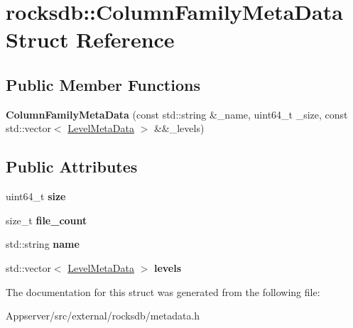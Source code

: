 \hypertarget{structrocksdb_1_1ColumnFamilyMetaData}{}\section{rocksdb\+:\+:Column\+Family\+Meta\+Data Struct Reference}
\label{structrocksdb_1_1ColumnFamilyMetaData}
\subsection*{Public Member Functions}
\begin{DoxyCompactItemize}
\item 
{\bfseries Column\+Family\+Meta\+Data} (const std\+::string \&\+\_\+name, uint64\+\_\+t \+\_\+size, const std\+::vector$<$ \hyperlink{structrocksdb_1_1LevelMetaData}{Level\+Meta\+Data} $>$ \&\&\+\_\+levels)\hypertarget{structrocksdb_1_1ColumnFamilyMetaData_a5dc118259236aa00f2c6b5818c6feaca}{}\label{structrocksdb_1_1ColumnFamilyMetaData_a5dc118259236aa00f2c6b5818c6feaca}

\end{DoxyCompactItemize}
\subsection*{Public Attributes}
\begin{DoxyCompactItemize}
\item 
uint64\+\_\+t {\bfseries size}\hypertarget{structrocksdb_1_1ColumnFamilyMetaData_a06bba2173e3c44b00fa2c6791c5d18cf}{}\label{structrocksdb_1_1ColumnFamilyMetaData_a06bba2173e3c44b00fa2c6791c5d18cf}

\item 
size\+\_\+t {\bfseries file\+\_\+count}\hypertarget{structrocksdb_1_1ColumnFamilyMetaData_ab664d07cbc915c6f422c454de03c7901}{}\label{structrocksdb_1_1ColumnFamilyMetaData_ab664d07cbc915c6f422c454de03c7901}

\item 
std\+::string {\bfseries name}\hypertarget{structrocksdb_1_1ColumnFamilyMetaData_a54f36744201ce9e2faf5f50bdf3866ec}{}\label{structrocksdb_1_1ColumnFamilyMetaData_a54f36744201ce9e2faf5f50bdf3866ec}

\item 
std\+::vector$<$ \hyperlink{structrocksdb_1_1LevelMetaData}{Level\+Meta\+Data} $>$ {\bfseries levels}\hypertarget{structrocksdb_1_1ColumnFamilyMetaData_aed3050fed4270bcff4ccc76323062fdd}{}\label{structrocksdb_1_1ColumnFamilyMetaData_aed3050fed4270bcff4ccc76323062fdd}

\end{DoxyCompactItemize}


The documentation for this struct was generated from the following file\+:\begin{DoxyCompactItemize}
\item 
Appserver/src/external/rocksdb/metadata.\+h\end{DoxyCompactItemize}
